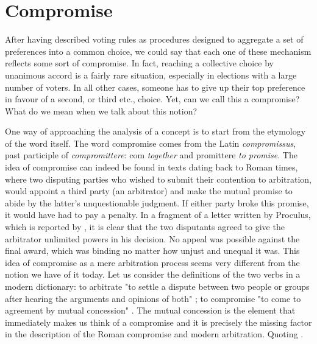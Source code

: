 
\section{Compromise}

After having described voting rules as procedures designed to aggregate a set of preferences into a common choice, we could say that each one of these mechanism reflects some sort of compromise. In fact, reaching a collective choice by unanimous accord is a fairly rare situation, especially in elections with a large number of voters. In all other cases, someone has to give up their top preference in favour of a second, or third etc., choice. Yet, can we call this a compromise? What do we mean when we talk about this notion?

One way of approaching the analysis of a concept is to start from the etymology of the word itself. The word compromise comes from the Latin \textit{compromissus}, past participle of \textit{compromittere}: com \textit{together} and promittere \textit{to promise}.
The idea of compromise can indeed be found in texts dating back to Roman times, where two disputing parties who wished to submit their contention to arbitration, would appoint a third party (an arbitrator) and make the mutual promise to abide by the latter's unquestionable judgment. If either party broke this promise, it would have had to pay a penalty.
In a fragment of a letter written by Proculus, which is reported by \citet[p.529]{Zimmermann1996}, it is clear that the two disputants agreed to give the arbitrator unlimited powers in his decision. No appeal was possible against the final award, which was binding no matter how unjust and unequal it was. This idea of compromise as a mere arbitration process seems very different from the notion we have of it today. Let us consider the definitions of the two verbs in a modern dictionary: to arbitrate "to settle a dispute between two people or groups after hearing the arguments and opinions of both" \citep{Arbitration}; to compromise "to come to agreement by mutual concession" \citep{Compromise}.
The mutual concession is the element that immediately makes us think of a compromise and it is precisely the missing factor in the description of the Roman compromise and modern arbitration. Quoting \citet{Braybrooke1982} .

